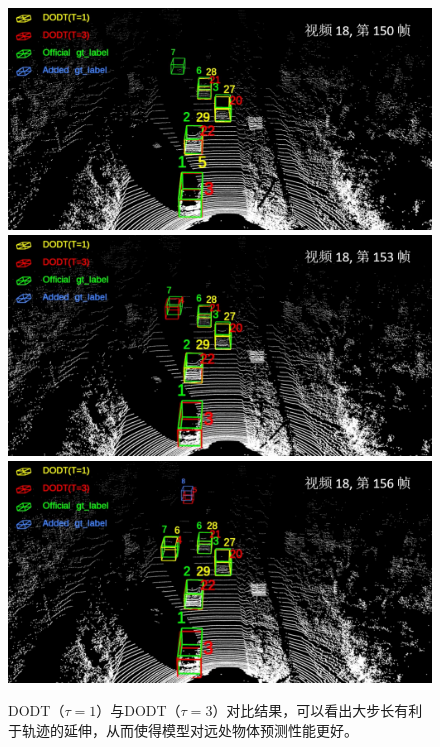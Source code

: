 \begin{figure}[t]
	\centering
	\includegraphics[width=\textwidth]{./imgs/viz_results/val/dodt_1_3_01.png}\vspace{1pt}
	\includegraphics[width=\textwidth]{./imgs/viz_results/val/dodt_1_3_02.png}\vspace{1pt}
	\includegraphics[width=\textwidth]{./imgs/viz_results/val/dodt_1_3_03.png}
	\caption{DODT（$\tau=1$）与DODT（$\tau=3$）对比结果，可以看出大步长有利于轨迹的延伸，从而使得模型对远处物体预测性能更好。}
	\label{fig:dodt_1_3}
\end{figure}

